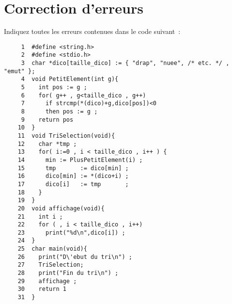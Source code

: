 \section{Correction d'erreurs}
\label{sec:CorrectionDErreurs}
Indiquez toutes les erreurs contenues dans le code suivant~:
\begin{verbatim}
     1  #define <string.h>
     2  #define <stdio.h>
     3  char *dico[taille_dico] := { "drap", "nuee", /* etc. */ , "emut" }; 
     4  void PetitElement(int g){
     5    int pos := g ;
     6    for( g++ , g<taille_dico , g++)
     7      if strcmp(*(dico)+g,dico[pos])<0
     8      then pos := g ;
     9    return pos 
    10  }
    11  void TriSelection(void){
    12    char *tmp ;
    13    for( i:=0 , i < taille_dico , i++ ) {
    14      min := PlusPetitElement(i) ;
    15      tmp       := dico[min] ;
    16      dico[min] := *(dico+i) ;
    17      dico[i]   := tmp       ;
    18    }  
    19  }
    20  void affichage(void){
    21    int i ;
    22    for ( , i < taille_dico , i++)
    23      print("%d\n",dico[i]) ;
    24  }
    25  char main(void){
    26    print("D\'ebut du tri\n") ;
    27    TriSelection;
    28    print("Fin du tri\n") ;
    29    affichage ;
    30    return 1 
    31  }
\end{verbatim}
